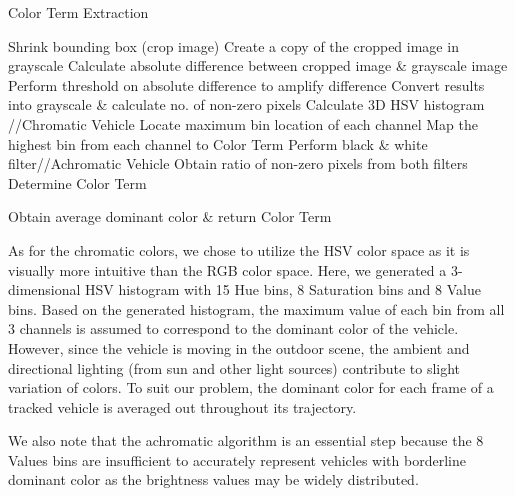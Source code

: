 \documentclass[runningheads]{llncs}
\newcommand\tab[1][1cm]{\hspace*{#1}}
\newcommand{\ian}[1]{\textcolor{red}{#1}}
\newcommand{\ian}[1]{}   %
\begin{document}
 \begin{algorithm}[!h]
  \caption{Color Term Extraction}
  \label{algo:colorExtract}
  \begin{algorithmic}[1]
        \STATE Shrink bounding box (crop image)
        \STATE Create a copy of the cropped image in grayscale
        \STATE Calculate absolute difference between cropped image \& grayscale image
        \STATE Perform threshold on absolute difference to amplify difference
        \STATE Convert results into grayscale \& calculate no. of non-zero pixels
                \STATE Calculate 3D HSV histogram \tab\tab //Chromatic Vehicle
                \STATE Locate maximum bin location of each channel
                \STATE Map the highest bin from each channel to Color Term
            \ELSE 
                \STATE Perform black \& white filter\tab\tab //Achromatic Vehicle
                \STATE Obtain ratio of non-zero pixels from both filters
                \STATE Determine Color Term
            \ENDIF

    \ENDFOR
    \STATE Obtain average dominant color \& return Color Term
  \end{algorithmic}
\end{algorithm}

As for the chromatic colors, we chose to utilize the HSV color space as it is visually more intuitive than the RGB color space. Here, we generated a 3-dimensional HSV histogram with 15 Hue bins, 8 Saturation bins and 8 Value bins. Based on the generated histogram, the maximum value of each bin from all 3 channels is assumed to correspond to the dominant color of the vehicle. However, since the vehicle is moving in the outdoor scene, the ambient and directional lighting (from sun and other light sources) contribute to slight variation of colors. To suit our problem, the dominant color for each frame of a tracked vehicle is averaged out throughout its 
trajectory.
 
We also note that the achromatic algorithm is an essential step because the 8 Values bins are insufficient to accurately represent vehicles with borderline dominant color as the brightness values may be widely distributed. 
 
\end{document}
